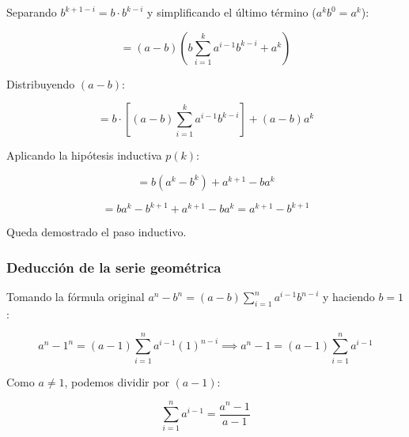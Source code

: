 \begin{ejercicio}
Separando $b^{k+1-i} = b \cdot b^{k-i}$ y simplificando el último término ($a^k b^0 = a^k$):

\[
= (a-b) \left( b \sum_{i=1}^{k} a^{i-1}b^{k-i} + a^k \right)
\]

Distribuyendo $(a-b)$:

\[
= b \cdot \left[ (a-b)\sum_{i=1}^{k} a^{i-1}b^{k-i} \right] + (a-b)a^k
\]

Aplicando la hipótesis inductiva $p(k)$:

\[
= b(a^k - b^k) + a^{k+1} - ba^k
\]

\[
= ba^k - b^{k+1} + a^{k+1} - ba^k = a^{k+1} - b^{k+1}
\]

Queda demostrado el paso inductivo.

\vspace{0.5cm}

\subsubsection*{Deducción de la serie geométrica}

Tomando la fórmula original $a^n - b^n = (a-b)\sum_{i=1}^{n} a^{i-1}b^{n-i}$ y haciendo $b = 1$:

\[
a^n - 1^n = (a-1)\sum_{i=1}^{n} a^{i-1}(1)^{n-i} \implies a^n - 1 = (a-1)\sum_{i=1}^{n} a^{i-1}
\]

Como $a \neq 1$, podemos dividir por $(a-1)$:

\[
\sum_{i=1}^{n} a^{i-1} = \frac{a^n - 1}{a - 1}
\]

\end{ejercicio}